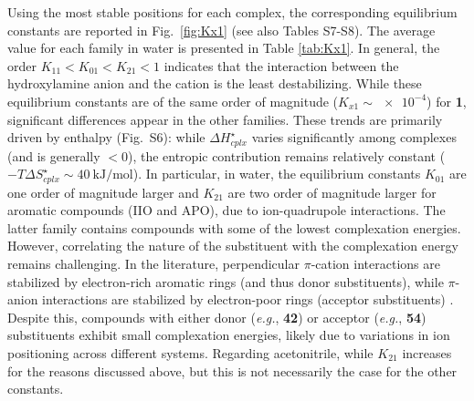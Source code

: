 \documentclass[review,preprint]{elsarticle}
\begin{document}
Using the most stable positions for each complex, the corresponding equilibrium constants are reported in Fig.~\ref{fig:Kx1} (see also Tables S7-S8). The average value for each family in water is presented in Table \ref{tab:Kx1}. In general, the order $K_{11} < K_{01} < K_{21} < 1$ indicates that the interaction between the hydroxylamine anion and the cation is the least destabilizing. While these equilibrium constants are of the same order of magnitude ($K_{x1} \sim \num{e-4}$) for \textbf{1}, significant differences appear in the other families.  These trends are primarily driven by enthalpy (Fig.~S6): while $\Delta H^\star_{cplx}$ varies significantly among complexes (and is generally $<0$), the entropic contribution remains relatively constant ($-T\Delta S^\star_{cplx} \sim \SI{40}{\kilo\joule\per\mole}$).
In particular, in water, the equilibrium constants $K_{01}$ are one order of magnitude larger and $K_{21}$ are two order of magnitude larger for aromatic compounds (IIO and APO), due to ion-quadrupole interactions. The latter family contains compounds with some of the lowest complexation energies.  However, correlating the nature of the substituent with the complexation energy remains challenging. In the literature, perpendicular $\pi$-cation interactions are stabilized by electron-rich aromatic rings (and thus donor substituents), while $\pi$-anion interactions are stabilized by electron-poor rings (acceptor substituents) \cite{pappFourFacesInteraction2017}. Despite this, compounds with either donor (\textit{e.g.}, \textbf{42}) or acceptor (\textit{e.g.}, \textbf{54}) substituents exhibit small complexation energies, likely due to variations in ion positioning across different systems. Regarding acetonitrile, while $K_{21}$ increases for the reasons discussed above, but this is not necessarily the case for the other constants. 
\end{document}

